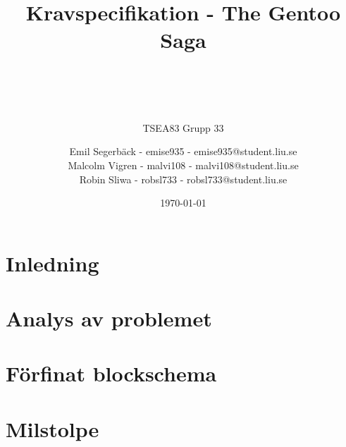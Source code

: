 \documentclass[a4paper,titlepage]{article}
\title{
    \textbf{Kravspecifikation - The Gentoo Saga} \\
    \subtitle{TSEA83 Grupp 33}
    \author{
        Emil Segerbäck - emise935 - emise935@student.liu.se\\Malcolm Vigren -
        malvi108 - malvi108@student.liu.se \\Robin Sliwa - robsl733 -
        robsl733@student.liu.se
            }
    \\
    \date{\today}
        }
\begin{document}
    \maketitle
    \newpage

\section{Inledning}

\newpage
\section{Analys av problemet}

\newpage
\section{Förfinat blockschema}

\newpage
\section{Milstolpe}
\end{document}
